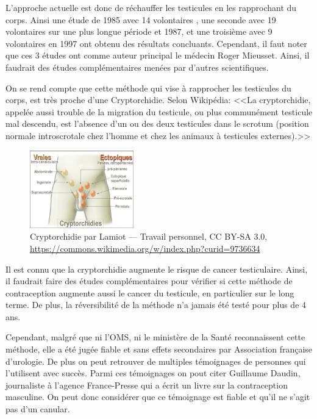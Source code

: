 \documentclass[12pt,a4paper]{report}
\begin{document}
L'approche actuelle est donc de réchauffer les testicules en les rapprochant du corps.
Ainsi une étude de 1985 avec 14 volontaires \cite{mieussetInhibitingEffectArtificial1985}, une seconde avec 19 volontaires sur une plus longue période et 1987\cite{mieussetHyperthermiaHumanSpermatogenesis1987}, et une troisième avec 9 volontaires en 1997\cite{mieussetPotentialMildTesticular1994} ont obtenu des résultats concluants.
Cependant, il faut noter que ces 3 études ont comme auteur principal le médecin Roger Mieusset. Ainsi, il faudrait des études complémentaires menées par d'autres scientifiques.

On se rend compte que cette méthode qui vise à rapprocher les testicules du corps, est très proche d'une Cryptorchidie.
Selon Wikipédia: <<La cryptorchidie, appelée aussi trouble de la migration du testicule, ou plus communément testicule mal descendu, est l'absence d'un ou des deux testicules dans le scrotum (position normale introscrotale chez l'homme et chez les animaux à testicules externes).>>\cite{Cryptorchidie2023a}

\begin{figure}[H]
    \centering
    \includegraphics[width=0.4\textwidth]{images/scientiphique/CryptorchidismForms.jpg}
    \caption{Cryptorchidie par Lamiot — Travail personnel, CC BY-SA 3.0, \href{https://commons.wikimedia.org/w/index.php?curid=9736634}{https://commons.wikimedia.org/w/index.php?curid=9736634}}
    \label{fig:cryptorchidie}
\end{figure}

Il est connu que la cryptorchidie augmente le risque de cancer testiculaire. \cite{CryptorchidieOuTesticule}
Ainsi, il faudrait faire des études complémentaires pour vérifier si cette méthode de contraception augmente aussi le cancer du testicule, en particulier sur le long terme. De plus, la réversibilité de la méthode n'a jamais été testé pour plus de 4 ans. \cite{NoticeUtilisationPdf2022}

Cependant, malgré que ni l'OMS, ni le ministère de la Santé reconnaissent cette méthode, elle a été jugée fiable et sans effets secondaires par Association française d'urologie.\cite{ContraceptionMasculineAucune2021}
De plus on peut retrouver de multiples témoignages de personnes qui l'utilisent avec succès.
Parmi ces témoignages on pout citer Guillaume Daudin, journaliste à l'agence France-Presse qui a écrit un livre sur la contraception masculine. \cite{guillaumedaudinContraceptesEnqueteDernier2022}
On peut donc considérer que ce témoignage est fiable et qu'il ne s'agit pas d'un canular.
\end{document}
